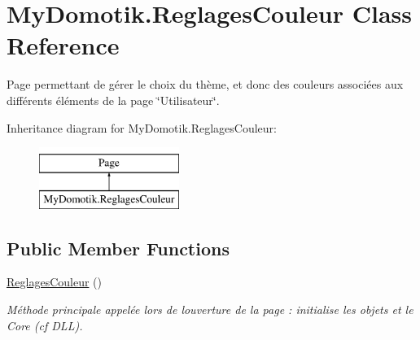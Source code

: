 \hypertarget{class_my_domotik_1_1_reglages_couleur}{}\section{My\+Domotik.\+Reglages\+Couleur Class Reference}
\label{class_my_domotik_1_1_reglages_couleur}


Page permettant de gérer le choix du thème, et donc des couleurs associées aux différents éléments de la page \char`\"{}\+Utilisateur\char`\"{}.  


Inheritance diagram for My\+Domotik.\+Reglages\+Couleur\+:\begin{figure}[H]
\begin{center}
\leavevmode
\includegraphics[height=2.000000cm]{class_my_domotik_1_1_reglages_couleur}
\end{center}
\end{figure}
\subsection*{Public Member Functions}
\begin{DoxyCompactItemize}
\item 
\hyperlink{class_my_domotik_1_1_reglages_couleur_a4fedb870b805c881363f4e06c0926b38}{Reglages\+Couleur} ()
\begin{DoxyCompactList}\small\item\em Méthode principale appelée lors de l\textquotesingle{}ouverture de la page \+: initialise les objets et le Core (cf D\+LL). \end{DoxyCompactList}\end{DoxyCompactItemize}
